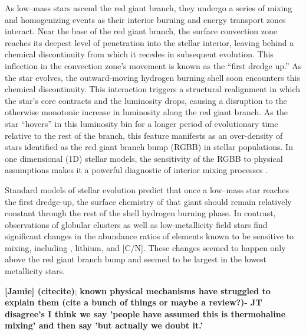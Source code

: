 As low--mass stars ascend the red giant branch, they undergo a series of mixing and homogenizing events as their interior burning and energy transport zones interact. Near the base of the red giant branch, the surface convection zone reaches its deepest level of penetration into the stellar interior, leaving behind a chemical discontinuity from which it recedes in subsequent evolution. This inflection in the convection zone's movement is known as the ``first dredge up.'' As the star evolves, the outward-moving hydrogen burning shell soon encounters this chemical discontinuity. This interaction triggers a structural realignment in which the star's core contracts and the luminosity drops, causing a disruption to the otherwise monotonic increase in luminosity along the red giant branch. As the star ``hovers'' in this luminosity bin for a longer period of evolutionary time relative to the rest of the branch, this feature manifests as an over-density of stars identified as the red giant branch bump (RGBB) in stellar populations. In one dimensional (1D) stellar models, the sensitivity of the RGBB to physical assumptions
makes it a powerful diagnostic of interior mixing processes \citep[e.g.][]{Joyce2015, Khan2018}. %

Standard models of stellar evolution predict that once a low--mass star reaches the first dredge-up, the surface chemistry of that giant should remain relatively constant through the rest of the shell hydrogen burning phase. In contrast, observations of globular clusters \citep{Carbon1982, Pilachowski1986, Kraft1994} as well as low-metallicity field stars \citep{Gratton2000} find significant changes in the abundance ratios of elements known to be sensitive to mixing, including \ctwelvecthirteen, lithium, and [C/N]. 
These changes seemed to happen only above the red giant branch bump
and seemed to be largest in the lowest metallicity stars.

\textbf{ [Jamie] (citecite)}; \textbf{known physical mechanisms have struggled to explain them \citep{TayarJoyce22}
(cite a bunch of things or maybe a review?)- JT disagree's I think we say 'people have assumed this is thermohaline mixing' and then say 'but actually we doubt it.'} 

